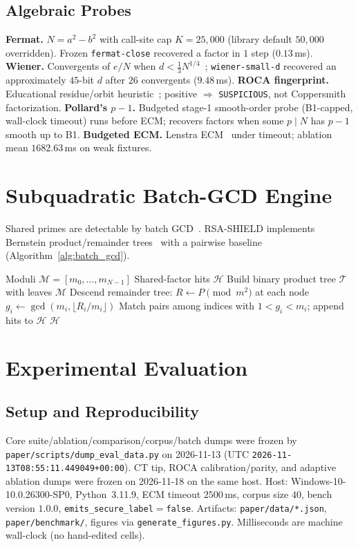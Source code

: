 \documentclass[conference]{IEEEtran}
\begin{document}
\subsection{Algebraic Probes}
\textbf{Fermat.} $N{=}a^{2}{-}b^{2}$ with call-site cap $K{=}25{,}000$ (library default $50{,}000$ overridden). Frozen \texttt{fermat-close} recovered a factor in $1$ step ($0.13$\,ms).
\textbf{Wiener.} Convergents of $e/N$ when $d{<}\tfrac13 N^{1/4}$~\cite{wiener1990cryptanalysis}; \texttt{wiener-small-d} recovered an approximately $45$-bit $d$ after $26$ convergents ($9.48$\,ms).
\textbf{ROCA fingerprint.} Educational residue/orbit heuristic~\cite{nemec2017return}; positive $\Rightarrow$ \texttt{SUSPICIOUS}, not Coppersmith factorization.
\textbf{Pollard's $p{-}1$.} Budgeted stage-1 smooth-order probe (B1-capped, wall-clock timeout) runs before ECM; recovers factors when some $p\mid N$ has $p{-}1$ smooth up to B1.
\textbf{Budgeted ECM.} Lenstra ECM~\cite{lenstra1987factoring} under timeout; ablation mean $1682.63$\,ms on weak fixtures.

\section{Subquadratic Batch-GCD Engine}
Shared primes are detectable by batch GCD~\cite{heninger2012mining}. RSA-SHIELD implements Bernstein product/remainder trees~\cite{bernstein2004find} with a pairwise baseline (Algorithm~\ref{alg:batch_gcd}).

\begin{algorithm}[t]
\caption{Subquadratic Batch-GCD (implementation sketch)}
\label{alg:batch_gcd}
\begin{algorithmic}[1]
\REQUIRE Moduli $\mathcal{M}=[m_0,\dots,m_{N-1}]$
\ENSURE Shared-factor hits $\mathcal{H}$
\STATE Build binary product tree $\mathcal{T}$ with leaves $\mathcal{M}$
\STATE Descend remainder tree: $R \leftarrow P \pmod{m^{2}}$ at each node
    \STATE $g_i \leftarrow \gcd(m_i, \lfloor R_i / m_i \rfloor)$
\ENDFOR
\STATE Match pairs among indices with $1{<}g_i{<}m_i$; append hits to $\mathcal{H}$
\RETURN $\mathcal{H}$
\end{algorithmic}
\end{algorithm}

\section{Experimental Evaluation}
\label{sec:eval}
\subsection{Setup and Reproducibility}
Core suite/ablation/comparison/corpus/batch dumps were frozen by \texttt{paper/scripts/dump\_eval\_data.py} on 2026-11-13 (UTC \texttt{2026-11-13T08:55:11.449049+00:00}). CT tip, ROCA calibration/parity, and adaptive ablation dumps were frozen on 2026-11-18 on the same host. Host: Windows-10-10.0.26300-SP0, Python~3.11.9, ECM timeout $2500$\,ms, corpus size $40$, bench version $1.0.0$, \texttt{emits\_secure\_label}${=}$\texttt{false}. Artifacts: \texttt{paper/data/*.json}, \texttt{paper/benchmark/}, figures via \texttt{generate\_figures.py}. Milliseconds are machine wall-clock (no hand-edited cells).
\end{document}
